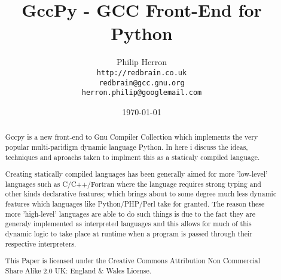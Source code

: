 \documentclass[defaultstyle,11pt]{article}
\begin{document}
\pagestyle{fancyplain}

\fancyhf{}
\rhead{\fancyplain{}{\today}}
\lfoot[\thepage]{}
\rfoot[]{\thepage}

\title{GccPy - GCC Front-End for Python}
\author{Philip Herron\\
  \texttt{http://redbrain.co.uk}\\
  \texttt{redbrain@gcc.gnu.org} \\
  \texttt{herron.philip@googlemail.com}\\
\byncsa}
\date{\today}
\maketitle
\begin{abstract}
Gccpy is a new front-end to Gnu Compiler Collection which implements the
very popular multi-paridigm dynamic language Python. In here i discuss the
ideas, techniques and aproachs taken to implment this as a staticaly compiled
language.

Creating statically compiled languages has
been generally aimed for more 'low-level' languages such as C/C++/Fortran where the language requires
strong typing and other kinds declarative features; which brings about to some degree much less dynamic
features which languages like Python/PHP/Perl take for granted. The reason these more 'high-level' 
languages are able to do such things is due to the fact they are generaly implemented as interpreted
languages and this allows for much of this dynamic logic to take place at runtime when a program is passed
through their respective interpreters.

This Paper is licensed under the Creative Commons Attribution Non Commercial Share Alike 2.0 UK: England \& Wales License.
\end{abstract}

\newpage

\tableofcontents
\listoffigures
\lstlistoflistings

\newcommand\stdsection{}
\newcommand\stdaddcontentsline{}
\let\stdsection\section
\let\stdaddcontentsline\addcontentsline
\let\section\subsection
\renewcommand\addcontentsline[3]{}
\lstlistoflistings
\let\section\stdsection
\let\addcontentsline\stdaddcontentsline
\end{document}
